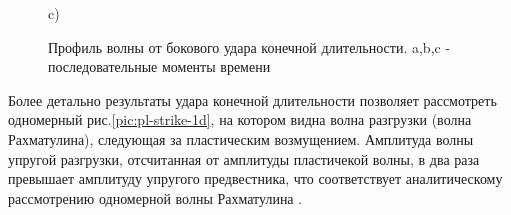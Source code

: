 \begin{figure}
\begin{minipage}{0.3\linewidth}
\end{minipage}
\hfill
\begin{minipage}{0.3\linewidth}
 c)\\
\end{minipage}
\caption{Профиль волны от бокового удара конечной длительности. a,b,c - последовательные моменты времени}
\label{pic:pl-strike-2d}
\end{figure}

Более детально результаты удара конечной длительности позволяет рассмотреть одномерный рис.\ref{pic:pl-strike-1d}, на котором видна волна разгрузки (волна Рахматулина), следующая за пластическим возмущением. Амплитуда волны упругой разгрузки, отсчитанная от амплитуды пластичекой волны, в два раза превышает амплитуду упругого предвестника, что соответствует аналитическому рассмотрению одномерной волны Рахматулина \cite{wilkins}.

